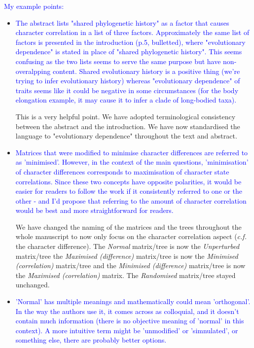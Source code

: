 \documentclass[12pt,letterpaper]{article}
\begin{document}
\textcolor{blue}{My example points:}

\begin{itemize}

\item{\textcolor{blue}{The abstract lists "shared phylogenetic history" as a factor that causes character correlation in a list of three factors. Approximately the same list of factors is presented in the introduction (p.5, bulletted), where "evolutionary dependence" is stated in place of "shared phylogenetic history". This seems confusing as the two lists seems to serve the same purpose but have non-overalpping content. Shared evolutionary history is a positive thing (we're trying to infer evolutionary history) whereas "evolutionary dependence" of traits seems like it could be negative in some circumstances (for the body elongation example, it may cause it to infer a clade of long-bodied taxa).}}

This is a very helpful point. We have adopted terminological consistency between the abstract and the introduction. We have now standardised the language to "evolutionary dependence" throughout the text and abstract.



\item{\textcolor{blue}{Matrices that were modified to minimise character differences are referred to as 'minimised'. However, in the context of the main questions, 'minimisation' of character differences corresponds to maximisation of character state correlations. Since these two concepts have opposite polarities, it would be easier for readers to follow the work if it consistently referred to one or the other - and I'd propose that referring to the amount of character correlation would be best and more straightforward for readers.}}

We have changed the naming of the matrices and the trees throughout the whole manuscript to now only focus on the character correlation aspect (\textit{c.f.} the character difference). The \textit{Normal} matrix/tree is now the \textit{Unperturbed} matrix/tree the \textit{Maximised (difference)} matrix/tree is now the \textit{Minimised (correlation)} matrix/tree and the \textit{Minimised (difference)} matrix/tree is now the \textit{Maximised (correlation)} matrix. The \textit{Randomised} matrix/tree stayed unchanged.



\item{\textcolor{blue}{'Normal' has multiple meanings and mathematically could mean 'orthogonal'. In the way the authors use it, it comes across as colloquial, and it doesn't contain much information (there is no objective meaning of 'normal' in this context). A more intuitive term might be 'unmodified' or 'simnulated', or something else, there are probably better options.}}


\end{itemize}
\end{document}
